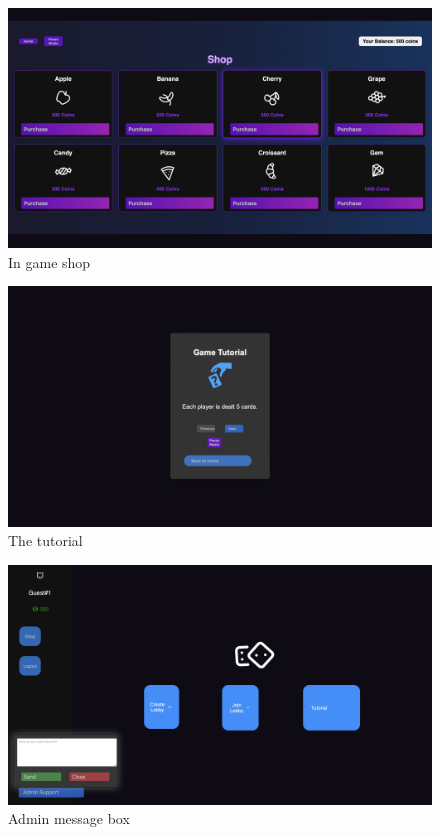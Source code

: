 \begin{figure}[h!]
\centering
\includegraphics[width=1\linewidth]{UI Screenshot 4.png}
\caption{In game shop}
\label{fig:ui4}
\end{figure}

\begin{figure}[h!]
\centering
\includegraphics[width=1\linewidth]{UI Screenshot 5.png}
\caption{The tutorial}
\label{fig:ui5}
\end{figure}

\begin{figure}[h!]
\centering
\includegraphics[width=1\linewidth]{UI Screenshot 6.png}
\caption{Admin message box}
\label{fig:ui6}
\end{figure}

